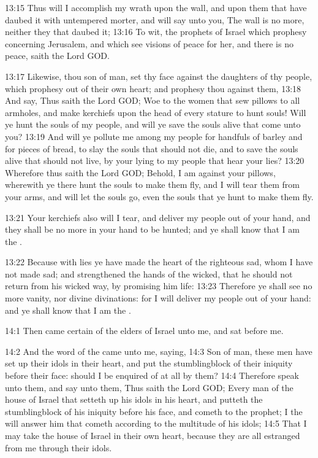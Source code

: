13:15 Thus will I accomplish my wrath upon the wall, and upon them
that have daubed it with untempered morter, and will say unto you, The
wall is no more, neither they that daubed it; 13:16 To wit, the
prophets of Israel which prophesy concerning Jerusalem, and which see
visions of peace for her, and there is no peace, saith the Lord GOD.

13:17 Likewise, thou son of man, set thy face against the daughters of
thy people, which prophesy out of their own heart; and prophesy thou
against them, 13:18 And say, Thus saith the Lord GOD; Woe to the women
that sew pillows to all armholes, and make kerchiefs upon the head of
every stature to hunt souls! Will ye hunt the souls of my people, and
will ye save the souls alive that come unto you?  13:19 And will ye
pollute me among my people for handfuls of barley and for pieces of
bread, to slay the souls that should not die, and to save the souls
alive that should not live, by your lying to my people that hear your
lies?  13:20 Wherefore thus saith the Lord GOD; Behold, I am against
your pillows, wherewith ye there hunt the souls to make them fly, and
I will tear them from your arms, and will let the souls go, even the
souls that ye hunt to make them fly.

13:21 Your kerchiefs also will I tear, and deliver my people out of
your hand, and they shall be no more in your hand to be hunted; and ye
shall know that I am the \LORD.

13:22 Because with lies ye have made the heart of the righteous sad,
whom I have not made sad; and strengthened the hands of the wicked,
that he should not return from his wicked way, by promising him life:
13:23 Therefore ye shall see no more vanity, nor divine divinations:
for I will deliver my people out of your hand: and ye shall know that
I am the \LORD.

14:1 Then came certain of the elders of Israel unto me, and sat before
me.

14:2 And the word of the \LORD came unto me, saying, 14:3 Son of man,
these men have set up their idols in their heart, and put the
stumblingblock of their iniquity before their face: should I be
enquired of at all by them?  14:4 Therefore speak unto them, and say
unto them, Thus saith the Lord GOD; Every man of the house of Israel
that setteth up his idols in his heart, and putteth the stumblingblock
of his iniquity before his face, and cometh to the prophet; I the \LORD
will answer him that cometh according to the multitude of his idols;
14:5 That I may take the house of Israel in their own heart, because
they are all estranged from me through their idols.

